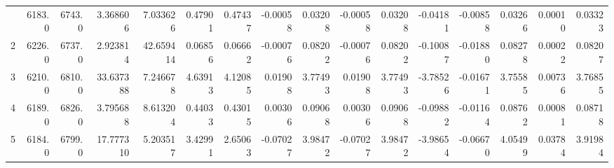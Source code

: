 \begin{longtable}{rrrrrrrrrrrrrrrr}
\bottomrule
\endlastfoot
           1 &          6183.0 &          6743.0 &            3.368606 &              7.033626 &                    0.47901 &                           0.47437 &                                        -0.00058 &                                            0.03208 &                                       -0.00058 &                                            0.03208 &                                          -0.04181 &                                           -0.00858 &                 0.03266 &                0.00010 &                   0.03323 \\
           2 &          6226.0 &          6737.0 &            2.923814 &             42.659414 &                    0.06856 &                           0.06662 &                                        -0.00076 &                                            0.08202 &                                       -0.00076 &                                            0.08202 &                                          -0.10087 &                                           -0.01880 &                 0.08278 &                0.00022 &                   0.08207 \\
           3 &          6210.0 &          6810.0 &           33.637388 &              7.246678 &                    4.63913 &                           4.12085 &                                         0.01908 &                                            3.77493 &                                        0.01908 &                                            3.77493 &                                          -3.78526 &                                           -0.01671 &                 3.75585 &                0.00736 &                   3.76855 \\
           4 &          6189.0 &          6826.0 &            3.795688 &              8.613204 &                    0.44033 &                           0.43015 &                                         0.00306 &                                            0.09068 &                                        0.00306 &                                            0.09068 &                                          -0.09882 &                                           -0.01164 &                 0.08762 &                0.00081 &                   0.08718 \\
           5 &          6184.0 &          6799.0 &           17.777310 &              5.203517 &                    3.42991 &                           2.65063 &                                        -0.07027 &                                            3.98472 &                                       -0.07027 &                                            3.98472 &                                          -3.98654 &                                           -0.06670 &                 4.05499 &                0.03784 &                   3.91984 \\

\end{longtable}
